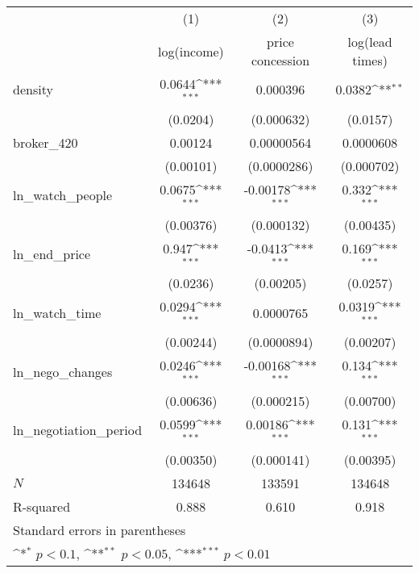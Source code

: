 {
\def\sym#1{\ifmmode^{#1}\else\(^{#1}\)\fi}
\begin{tabular}{l*{3}{c}}
\toprule
            &\multicolumn{1}{c}{(1)}&\multicolumn{1}{c}{(2)}&\multicolumn{1}{c}{(3)}\\
            &\multicolumn{1}{c}{log(income)}&\multicolumn{1}{c}{price concession}&\multicolumn{1}{c}{log(lead times)}\\
\midrule
density     &      0.0644\sym{***}&    0.000396         &      0.0382\sym{**} \\
            &    (0.0204)         &  (0.000632)         &    (0.0157)         \\
\addlinespace
broker\_420  &     0.00124         &  0.00000564         &   0.0000608         \\
            &   (0.00101)         & (0.0000286)         &  (0.000702)         \\
\addlinespace
ln\_watch\_people&      0.0675\sym{***}&    -0.00178\sym{***}&       0.332\sym{***}\\
            &   (0.00376)         &  (0.000132)         &   (0.00435)         \\
\addlinespace
ln\_end\_price&       0.947\sym{***}&     -0.0413\sym{***}&       0.169\sym{***}\\
            &    (0.0236)         &   (0.00205)         &    (0.0257)         \\
\addlinespace
ln\_watch\_time&      0.0294\sym{***}&   0.0000765         &      0.0319\sym{***}\\
            &   (0.00244)         & (0.0000894)         &   (0.00207)         \\
\addlinespace
ln\_nego\_changes&      0.0246\sym{***}&    -0.00168\sym{***}&       0.134\sym{***}\\
            &   (0.00636)         &  (0.000215)         &   (0.00700)         \\
\addlinespace
ln\_negotiation\_period&      0.0599\sym{***}&     0.00186\sym{***}&       0.131\sym{***}\\
            &   (0.00350)         &  (0.000141)         &   (0.00395)         \\
\midrule
\(N\)       &      134648         &      133591         &      134648         \\
R-squared   &       0.888         &       0.610         &       0.918         \\
\bottomrule
\multicolumn{4}{l}{\footnotesize Standard errors in parentheses}\\
\multicolumn{4}{l}{\footnotesize \sym{*} \(p<0.1\), \sym{**} \(p<0.05\), \sym{***} \(p<0.01\)}\\
\end{tabular}
}
